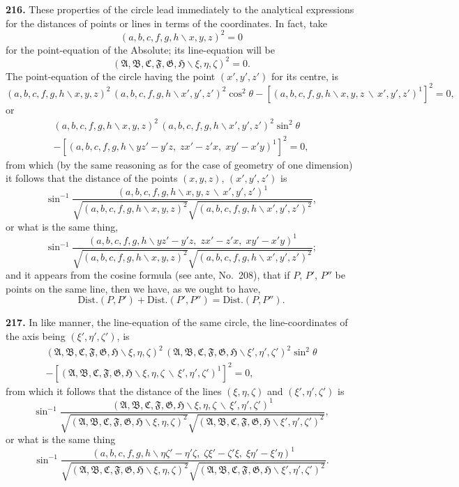 \documentclass[11pt,a4paper]{book}
\begin{document}
\begin{center}
\textbf{216.} These properties of the circle lead immediately to the analytical expressions
for the distances of points or lines in terms of the coordinates. In fact, take
\[
(a,b,c,f,g,h\!\backslash x,y,z)^2=0
\]
for the point-equation of the Absolute; its line-equation will be
\[
(\mathfrak{A},\mathfrak{B},\mathfrak{C},\mathfrak{F},\mathfrak{G},\mathfrak{H}\!\backslash \xi,\eta,\zeta)^2 = 0.
\]
The point-equation of the circle having the point $(x',y',z')$ for its centre, is
\[
(a,b,c,f,g,h\!\backslash x,y,z)^2\,(a,b,c,f,g,h\!\backslash x',y',z')^2\cos^2\theta
- [(a,b,c,f,g,h\!\backslash x,y,z\,\backslash\,x',y',z')^1]^2 = 0,
\]
or
\begin{multline*}
(a,b,c,f,g,h\!\backslash x,y,z)^2\,(a,b,c,f,g,h\!\backslash x',y',z')^2\sin^2\theta\\
- [(a,b,c,f,g,h\!\backslash yz'-y'z,\; zx'-z'x,\; xy'-x'y)^1]^2 = 0,
\end{multline*}
from which (by the same reasoning as for the case of geometry of one dimension) it
follows that the distance of the points $(x,y,z)$, $(x',y',z')$ is
\[
\sin^{-1}\frac{(a,b,c,f,g,h\!\backslash x,y,z\,\backslash\,x',y',z')^1}{\sqrt{(a,b,c,f,g,h\!\backslash x,y,z)^2}\sqrt{(a,b,c,f,g,h\!\backslash x',y',z')^2}},
\]
or what is the same thing,
\[
\sin^{-1}\frac{(a,b,c,f,g,h\!\backslash yz'-y'z,\; zx'-z'x,\; xy'-x'y)^1}{\sqrt{(a,b,c,f,g,h\!\backslash x,y,z)^2}\sqrt{(a,b,c,f,g,h\!\backslash x',y',z')^2}};
\]
and it appears from the cosine formula (see ante, No.~208), that if $P$, $P'$, $P''$ be
points on the same line, then we have, as we ought to have,
\[
\text{Dist.}(P,P') + \text{Dist.}(P',P'') = \text{Dist.}(P,P'').
\]

\textbf{217.} In like manner, the line-equation of the same circle, the line-coordinates of
the axis being $(\xi',\eta',\zeta')$, is
\begin{multline*}
(\mathfrak{A},\mathfrak{B},\mathfrak{C},\mathfrak{F},\mathfrak{G},\mathfrak{H}\!\backslash \xi,\eta,\zeta)^2\,(\mathfrak{A},\mathfrak{B},\mathfrak{C},\mathfrak{F},\mathfrak{G},\mathfrak{H}\!\backslash \xi',\eta',\zeta')^2\sin^2\theta\\
- [(\mathfrak{A},\mathfrak{B},\mathfrak{C},\mathfrak{F},\mathfrak{G},\mathfrak{H}\!\backslash \xi,\eta,\zeta\,\backslash\,\xi',\eta',\zeta')^1]^2 = 0,
\end{multline*}
from which it follows that the distance of the lines $(\xi,\eta,\zeta)$ and $(\xi',\eta',\zeta')$ is
\[
\sin^{-1}\frac{(\mathfrak{A},\mathfrak{B},\mathfrak{C},\mathfrak{F},\mathfrak{G},\mathfrak{H}\!\backslash \xi,\eta,\zeta\,\backslash\,\xi',\eta',\zeta')^1}{\sqrt{(\mathfrak{A},\mathfrak{B},\mathfrak{C},\mathfrak{F},\mathfrak{G},\mathfrak{H}\!\backslash \xi,\eta,\zeta)^2}\sqrt{(\mathfrak{A},\mathfrak{B},\mathfrak{C},\mathfrak{F},\mathfrak{G},\mathfrak{H}\!\backslash \xi',\eta',\zeta')^2}},
\]
or what is the same thing
\[
\sin^{-1}\frac{(a,b,c,f,g,h\!\backslash \eta\zeta'-\eta'\zeta,\; \zeta\xi'-\zeta'\xi,\; \xi\eta'-\xi'\eta)^1}{\sqrt{(\mathfrak{A},\mathfrak{B},\mathfrak{C},\mathfrak{F},\mathfrak{G},\mathfrak{H}\!\backslash \xi,\eta,\zeta)^2}\sqrt{(\mathfrak{A},\mathfrak{B},\mathfrak{C},\mathfrak{F},\mathfrak{G},\mathfrak{H}\!\backslash \xi',\eta',\zeta')^2}}.
\]


\end{center}
\end{document}
